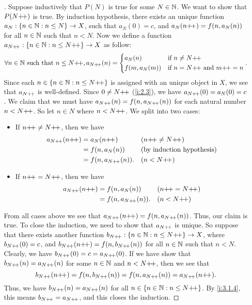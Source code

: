 \begin{proof}[]
  Suppose inductively that \(P(N)\) is true for some \(N \in \mathbb{N}\).
  We want to show that \(P(N{+}\!{+})\) is true.
  By induction hypothesis, there exists an unique function \(a_N : \left\lbrace n \in \mathbb{N} : n \leq N\right\rbrace \to X\), such that \(a_N(0) = c\), and \(a_N(n{+}\!{+}) = f(n, a_N(n))\) for all \(n \in \mathbb{N}\) such that \(n < N\).
  Now we define a function \(a_{N{+}\!{+}} : \left\lbrace n \in \mathbb{N} : n \leq N{+}\!{+}\right\rbrace \to X\) as follow:
  \[
    \forall n \in \mathbb{N} \text{ such that } n \leq N{+}\!{+}, a_{N{+}\!{+}}(n) = \begin{dcases}
      a_N(n)       & \text{if } n \neq N{+}\!{+}                    \\
      f(m, a_N(m)) & \text{if } n = N{+}\!{+} \text{ and } m{+}\!{+} = n
    \end{dcases}.
  \]
  Since each \(n \in \left\lbrace n \in \mathbb{N} : n \leq N{+}\!{+}\right\rbrace\) is assigned with an unique object in \(X\), we see that \(a_{N{+}\!{+}}\) is well-defined.
  Since \(0 \neq N{+}\!{+}\) (\cref{i:2.3}), we have \(a_{N{+}\!{+}}(0) = a_N(0) = c\).
  We claim that we must have \(a_{N{+}\!{+}}(n) = f(n, a_{N{+}\!{+}}(n))\) for each natural number \(n < N{+}\!{+}\).
  So let \(n \in N\) where \(n < N{+}\!{+}\).
  We split into two cases:
  \begin{itemize}
    \item If \(n{+}\!{+} \neq N{+}\!{+}\), then we have
          \begin{align*}
            a_{N{+}\!{+}}(n{+}\!{+}) & = a_N(n{+}\!{+})          &  & (n{+}\!{+} \neq N{+}\!{+}) \\
                           & = f(n, a_N(n))       &  & \text{(by induction hypothesis)}            \\
                           & = f(n, a_{N{+}\!{+}}(n)). &  & (n < N{+}\!{+})
          \end{align*}
    \item If \(n{+}\!{+} = N{+}\!{+}\), then we have
          \begin{align*}
            a_{N{+}\!{+}}(n{+}\!{+}) & = f(n, a_N(n))       &  & (n{+}\!{+} = N{+}\!{+}) \\
                           & = f(n, a_{N{+}\!{+}}(n)). &  & (n < N{+}\!{+})
          \end{align*}
  \end{itemize}
  From all cases above we see that \(a_{N{+}\!{+}}(n{+}\!{+}) = f(n, a_{N{+}\!{+}}(n))\).
  Thus, our claim is true.
  To close the induction, we need to show that \(a_{N{+}\!{+}}\) is unique.
  So suppose that there exists another function \(b_{N{+}\!{+}} : \left\lbrace n \in \mathbb{N} : n \leq N{+}\!{+}\right\rbrace \to X\), where \(b_{N{+}\!{+}}(0) = c\), and \(b_{N{+}\!{+}}(n{+}\!{+}) = f(n, b_{N{+}\!{+}}(n))\) for all \(n \in \mathbb{N}\) such that \(n < N\).
  Clearly, we have \(b_{N{+}\!{+}}(0) = c = a_{N{+}\!{+}}(0)\).
  If we have show that \(b_{N{+}\!{+}}(n) = a_{N{+}\!{+}}(n)\) for some \(n \in \mathbb{N}\) and \(n < N{+}\!{+}\), then we see that
  \[
    b_{N{+}\!{+}}(n{+}\!{+}) = f(n, b_{N{+}\!{+}}(n)) = f(n, a_{N{+}\!{+}}(n)) = a_{N{+}\!{+}}(n{+}\!{+}).
  \]
  Thus, we have \(b_{N{+}\!{+}}(n) = a_{N{+}\!{+}}(n)\) for all \(n \in \left\lbrace n \in \mathbb{N} : n \leq N{+}\!{+}\right\rbrace\).
  By \cref{i:3.1.4}, this means \(b_{N{+}\!{+}} = a_{N{+}\!{+}}\), and this closes the induction.


\end{proof}
